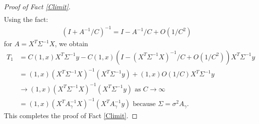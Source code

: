 \documentclass{scrartcl}
\begin{document}
\begin{proof}[Proof of Fact \ref{Climit}]
\begin{align*}
\end{align*}
Using the fact:
\begin{align*}
  \left(I + A^{-1}/C\right)^{-1} = I - A^{-1}/C + O(1/C^2)
\end{align*}
for $A = X^T \Sigma^{-1} X$, we obtain
\begin{align*}
  T_1 &= C(1, x) X^T \Sigma^{-1} y - C(1, x) \left(I - (X^T \Sigma^{-1}
        X)^{-1}/C +
        O(1/C^2) \right) X^T \Sigma^{-1} y \\
  &= (1, x) (X^T \Sigma^{-1} X)^{-1} (X^T \Sigma^{-1} y) + (1, x)
    O(1/C) X^T \Sigma^{-1} y \\
  &\rightarrow (1, x) (X^T \Sigma^{-1} X)^{-1} (X^T \Sigma^{-1} y)
    \text{ as $C \rightarrow \infty$} \\
  &= (1, x) (X^TA_{\gamma}^{-1} X)^{-1} (X^T A_{\gamma}^{-1} y)
    \text{ because $\Sigma = \sigma^2 A_{\gamma}$}. 
\end{align*}
This completes the proof of Fact \ref{Climit}. 
\end{proof} 








  


  
\end{document}

